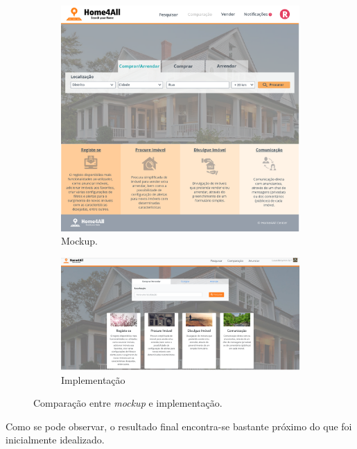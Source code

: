 \begin{figure}[htb]
\centering
    \begin{subfigure}[h]{0.39\textwidth}
        \includegraphics[width=\textwidth]{images/UI/Home_Login.png}
        \caption{Mockup.}
        \label{fig:fig1}
    \end{subfigure}
        \begin{subfigure}[h]{0.6\textwidth}
        \includegraphics[width=\textwidth]{images/UI/home-real.png}
        \caption{Implementação}
        \label{fig:fig2}
    \end{subfigure}
\caption{Comparação entre \textit{mockup} e implementação.}
\label{fig:subfigureexample}
\end{figure}

Como se pode observar, o resultado final encontra-se bastante próximo do que foi inicialmente idealizado.

